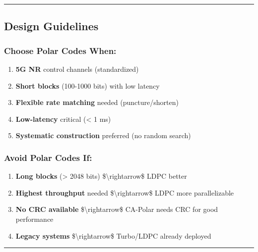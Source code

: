 \begin{center}\rule{0.5\linewidth}{0.5pt}\end{center}

\subsection{Design Guidelines}\label{design-guidelines}

\subsubsection{Choose Polar Codes When:}\label{choose-polar-codes-when}

\begin{enumerate}
\def\labelenumi{\arabic{enumi}.}
\tightlist
\item
  \textbf{5G NR} control channels (standardized)
\item
  \textbf{Short blocks} (100-1000 bits) with low latency
\item
  \textbf{Flexible rate matching} needed (puncture/shorten)
\item
  \textbf{Low-latency} critical (\textless{} 1 ms)
\item
  \textbf{Systematic construction} preferred (no random search)
\end{enumerate}

\subsubsection{Avoid Polar Codes If:}\label{avoid-polar-codes-if}

\begin{enumerate}
\def\labelenumi{\arabic{enumi}.}
\tightlist
\item
  \textbf{Long blocks} (\textgreater{} 2048 bits)
  \$\textbackslash rightarrow\$ LDPC better
\item
  \textbf{Highest throughput} needed \$\textbackslash rightarrow\$ LDPC
  more parallelizable
\item
  \textbf{No CRC available} \$\textbackslash rightarrow\$ CA-Polar needs
  CRC for good performance
\item
  \textbf{Legacy systems} \$\textbackslash rightarrow\$ Turbo/LDPC
  already deployed
\end{enumerate}

\begin{center}\rule{0.5\linewidth}{0.5pt}\end{center}

